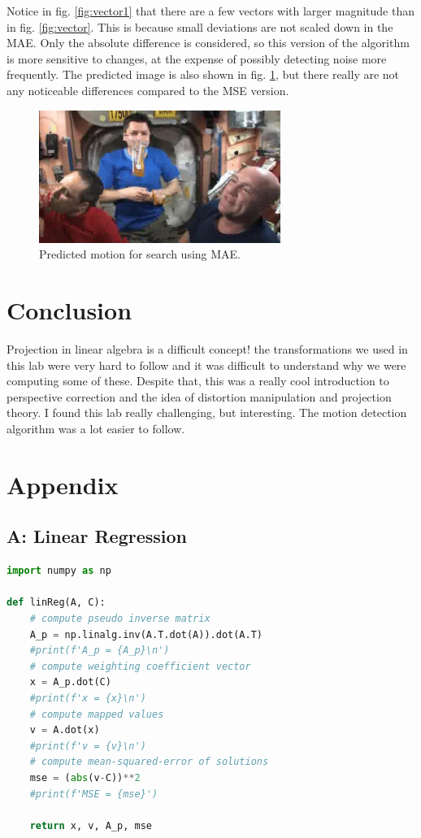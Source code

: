 \documentclass[11pt,a4paper]{article}
\begin{document}
Notice in fig. \ref{fig:vector1} that there are a few vectors with larger magnitude than in fig. \ref{fig:vector}. This is because small deviations are not scaled down in the MAE. Only the absolute difference is considered, so this version of the algorithm is more sensitive to changes, at the expense of possibly detecting noise more frequently. The predicted image is also shown in fig. \ref{fig:predicted1}, but there really are not any noticeable differences compared to the MSE version.

\begin{figure}[ht]
	\centering
	\includegraphics[width=0.7\textwidth]{predicted1}
	\caption{Predicted motion for search using MAE.}
	\label{fig:predicted1}
\end{figure}

\pagebreak

\section{Conclusion}
Projection in linear algebra is a difficult concept! the transformations we used in this lab were very hard to follow and it was difficult to understand why we were computing some of these. Despite that, this was a really cool introduction to perspective correction and the idea of distortion manipulation and projection theory. I found this lab really challenging, but interesting. The motion detection algorithm was a lot easier to follow. 

\pagebreak

\section{Appendix}
\subsection{A: Linear Regression}
\begin{lstlisting}[language=Python]
import numpy as np

def linReg(A, C):
    # compute pseudo inverse matrix
    A_p = np.linalg.inv(A.T.dot(A)).dot(A.T)
    #print(f'A_p = {A_p}\n')
    # compute weighting coefficient vector
    x = A_p.dot(C)
    #print(f'x = {x}\n')
    # compute mapped values
    v = A.dot(x)
    #print(f'v = {v}\n')
    # compute mean-squared-error of solutions
    mse = (abs(v-C))**2
    #print(f'MSE = {mse}')
    
    return x, v, A_p, mse
\end{lstlisting}
\end{document}
